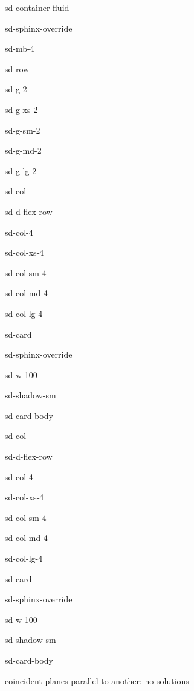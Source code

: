 \documentclass[letterpaper,10pt,english]{jupyterBook}
\begin{document}
\begin{sphinxuseclass}{sd-container-fluid}
\begin{sphinxuseclass}{sd-sphinx-override}
\begin{sphinxuseclass}{sd-mb-4}
\begin{sphinxuseclass}{sd-row}
\begin{sphinxuseclass}{sd-g-2}
\begin{sphinxuseclass}{sd-g-xs-2}
\begin{sphinxuseclass}{sd-g-sm-2}
\begin{sphinxuseclass}{sd-g-md-2}
\begin{sphinxuseclass}{sd-g-lg-2}
\begin{sphinxuseclass}{sd-col}
\begin{sphinxuseclass}{sd-d-flex-row}
\begin{sphinxuseclass}{sd-col-4}
\begin{sphinxuseclass}{sd-col-xs-4}
\begin{sphinxuseclass}{sd-col-sm-4}
\begin{sphinxuseclass}{sd-col-md-4}
\begin{sphinxuseclass}{sd-col-lg-4}
\begin{sphinxuseclass}{sd-card}
\begin{sphinxuseclass}{sd-sphinx-override}
\begin{sphinxuseclass}{sd-w-100}
\begin{sphinxuseclass}{sd-shadow-sm}
\begin{sphinxuseclass}{sd-card-body}
\end{sphinxuseclass}
\end{sphinxuseclass}
\end{sphinxuseclass}
\end{sphinxuseclass}
\end{sphinxuseclass}
\end{sphinxuseclass}
\end{sphinxuseclass}
\end{sphinxuseclass}
\end{sphinxuseclass}
\end{sphinxuseclass}
\end{sphinxuseclass}
\end{sphinxuseclass}
\begin{sphinxuseclass}{sd-col}
\begin{sphinxuseclass}{sd-d-flex-row}
\begin{sphinxuseclass}{sd-col-4}
\begin{sphinxuseclass}{sd-col-xs-4}
\begin{sphinxuseclass}{sd-col-sm-4}
\begin{sphinxuseclass}{sd-col-md-4}
\begin{sphinxuseclass}{sd-col-lg-4}
\begin{sphinxuseclass}{sd-card}
\begin{sphinxuseclass}{sd-sphinx-override}
\begin{sphinxuseclass}{sd-w-100}
\begin{sphinxuseclass}{sd-shadow-sm}
\begin{sphinxuseclass}{sd-card-body}
\begin{figure}[htbp]
\centering

\noindent{}
\end{figure}

 coincident planes parallel to another: no solutions


\end{sphinxuseclass}
\end{sphinxuseclass}
\end{sphinxuseclass}
\end{sphinxuseclass}
\end{sphinxuseclass}
\end{sphinxuseclass}
\end{sphinxuseclass}
\end{sphinxuseclass}
\end{sphinxuseclass}
\end{sphinxuseclass}
\end{sphinxuseclass}
\end{sphinxuseclass}
\end{sphinxuseclass}
\end{sphinxuseclass}
\end{sphinxuseclass}
\end{sphinxuseclass}
\end{sphinxuseclass}
\end{sphinxuseclass}
\end{sphinxuseclass}
\end{sphinxuseclass}
\end{sphinxuseclass}
\end{document}
